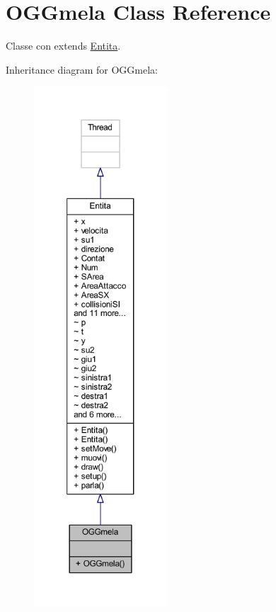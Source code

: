 \hypertarget{classoggetti_1_1_o_g_gmela}{}\section{O\+G\+Gmela Class Reference}
\label{classoggetti_1_1_o_g_gmela}


Classe con extends \hyperlink{namespace_entita}{Entita}.  




Inheritance diagram for O\+G\+Gmela\+:
\nopagebreak
\begin{figure}[H]
\begin{center}
\leavevmode
\includegraphics[height=550pt]{classoggetti_1_1_o_g_gmela__inherit__graph}
\end{center}
\end{figure}


